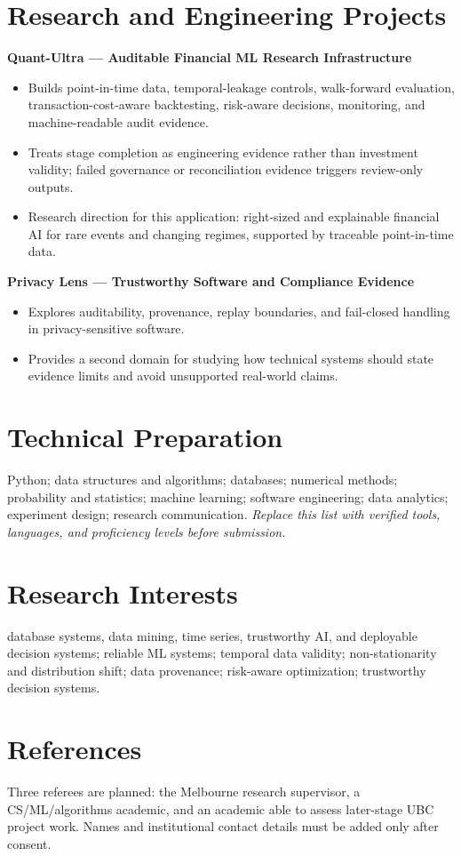 \documentclass[11pt]{article}
\begin{document}
\section*{Research and Engineering Projects}
\textbf{Quant-Ultra --- Auditable Financial ML Research Infrastructure}
\begin{itemize}
\item Builds point-in-time data, temporal-leakage controls, walk-forward evaluation, transaction-cost-aware backtesting, risk-aware decisions, monitoring, and machine-readable audit evidence.
\item Treats stage completion as engineering evidence rather than investment validity; failed governance or reconciliation evidence triggers review-only outputs.
\item Research direction for this application: right-sized and explainable financial AI for rare events and changing regimes, supported by traceable point-in-time data.
\end{itemize}

\begin{samepage}
\textbf{Privacy Lens --- Trustworthy Software and Compliance Evidence}
\begin{itemize}
\item Explores auditability, provenance, replay boundaries, and fail-closed handling in privacy-sensitive software.
\item Provides a second domain for studying how technical systems should state evidence limits and avoid unsupported real-world claims.
\end{itemize}
\end{samepage}

\section*{Technical Preparation}
Python; data structures and algorithms; databases; numerical methods; probability and statistics; machine learning; software engineering; data analytics; experiment design; research communication. \textit{Replace this list with verified tools, languages, and proficiency levels before submission.}

\section*{Research Interests}
database systems, data mining, time series, trustworthy AI, and deployable decision systems; reliable ML systems; temporal data validity; non-stationarity and distribution shift; data provenance; risk-aware optimization; trustworthy decision systems.

\section*{References}
Three referees are planned: the Melbourne research supervisor, a CS/ML/algorithms academic, and an academic able to assess later-stage UBC project work. Names and institutional contact details must be added only after consent.
\end{document}
